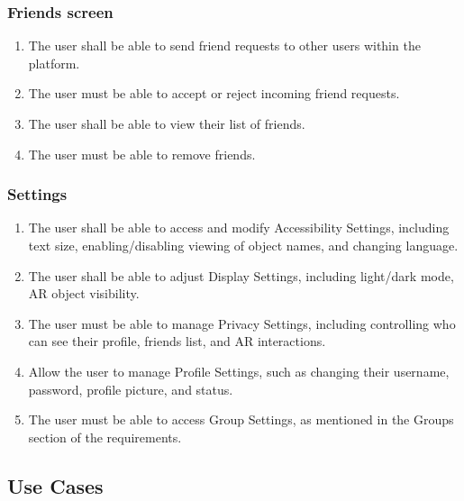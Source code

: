 \documentclass{article}
\begin{document}
\subsubsection{Friends screen}
\label{ssub:friends_screen}
\begin{enumerate}[align=left, label=\textbf{FS-FR\arabic*:}]
    \item The user shall be able to send friend requests to other users within the platform.
    \item The user must be able to accept or reject incoming friend requests.
    \item The user shall be able to view their list of friends.
    \item The user must be able to remove friends.
\end{enumerate}

\subsubsection{Settings}
\label{ssub:settings}
\begin{enumerate}[align=left, label=\textbf{S-FR\arabic*:}]
    \item The user shall be able to access and modify Accessibility Settings, including text size, enabling/disabling viewing of object names, and changing language.
    \item The user shall be able to adjust Display Settings, including light/dark mode, AR object visibility.
    \item The user must be able to manage Privacy Settings, including controlling who can see their profile, friends list, and AR interactions.
    \item Allow the user to manage Profile Settings, such as changing their username, password, profile picture, and status.
    \item The user must be able to access Group Settings, as mentioned in the Groups section of the requirements.
\end{enumerate}

\subsection{Use Cases}
\label{sub:use_cases}
\end{document}
